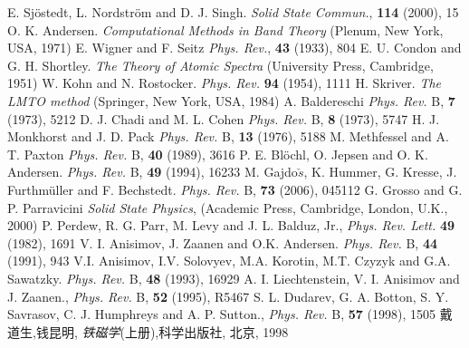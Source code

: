 {{\begin{thebibliography}{99}
{	\textrm{E. Sj\"ostedt, L. Nordstr\"om and D. J. Singh. \textit{Solid State Commun.}, \textbf{114} (2000), 15}
	\textrm{O. K. Andersen. \textit{Computational Methods in Band Theory} (Plenum, New York, USA, 1971)}
	\textrm{E. Wigner and F. Seitz \textit{Phys. Rev.}, \textbf{43} (1933), 804}
	\textrm{E. U. Condon and G. H. Shortley. \textit{The Theory of Atomic Spectra} (University Press, Cambridge, 1951)}
	\textrm{W. Kohn and N. Rostocker. \textit{Phys. Rev.} \textbf{94} (1954), 1111}
	\textrm{H. Skriver. \textit{The LMTO method} (Springer, New York, USA, 1984)}
	\textrm{A. Baldereschi \textit{Phys. Rev.} B, \textbf{7} (1973), 5212}
	\textrm{D. J. Chadi and M. L. Cohen \textit{Phys. Rev.} B, \textbf{8} (1973), 5747}
	\textrm{H. J. Monkhorst and J. D. Pack \textit{Phys. Rev.} B, \textbf{13} (1976), 5188}
	\textrm{M. Methfessel and A. T. Paxton \textit{Phys. Rev.} B, \textbf{40} (1989), 3616}
	\textrm{P. E. Bl\"ochl, O. Jepsen and O. K. Andersen. \textit{Phys. Rev.} B, \textbf{49} (1994), 16233}
\textrm{M. Gajdo$\check{s}$, K. Hummer, G. Kresse, J. Furthm\"uller and F. Bechstedt. \textit{Phys. Rev.} B, \textbf{73} (2006), 045112}
\textrm{G. Grosso and G. P. Parravicini \textit{Solid State Physics},  (Academic Press, Cambridge, London, U.K., 2000)}
	\textrm{P. Perdew, R. G. Parr, M. Levy and J. L. Balduz, Jr., \textit{Phys. Rev. Lett.} \textbf{49} (1982), 1691}
	\textrm{V. I. Anisimov, J. Zaanen and O.K. Andersen. \textit{Phys. Rev.} B, \textbf{44} (1991), 943}
	\textrm{V.I. Anisimov, I.V. Solovyev, M.A. Korotin, M.T. Czyzyk and G.A. Sawatzky. \textit{Phys. Rev.} B, \textbf{48} (1993), 16929}
	\textrm{A. I. Liechtenstein, V. I. Anisimov and J. Zaanen., \textit{Phys. Rev.} B, \textbf{52} (1995), R5467}
	\textrm{S. L. Dudarev, G. A. Botton, S. Y. Savrasov, C. J. Humphreys and A. P. Sutton., \textit{Phys. Rev.} B, \textbf{57} (1998), 1505}
戴道生,钱昆明, {\textit{铁磁学}}(上册),\:科学出版社, 北京, 1998
}
\end{thebibliography}}}
